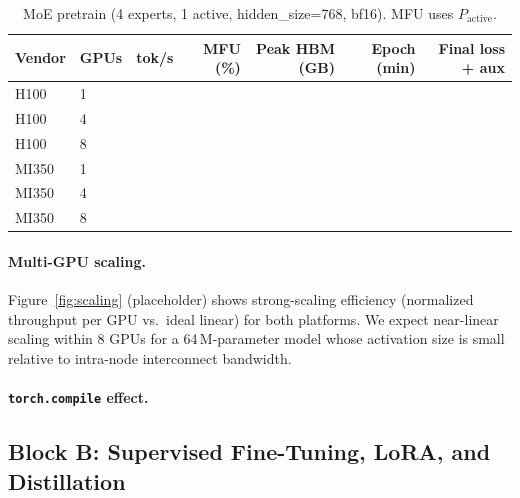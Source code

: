 \begin{table}[h]
\centering
\caption{MoE pretrain (4 experts, 1 active, hidden\_size=768, bf16). MFU uses $P_{\text{active}}$.}
\label{tab:pretrain_moe}
\small
\begin{tabular}{llrrrrr}
\toprule
\textbf{Vendor} & \textbf{GPUs} &
\textbf{tok/s} & \textbf{MFU (\%)} & \textbf{Peak HBM (GB)} &
\textbf{Epoch (min)} & \textbf{Final loss + aux} \\
\midrule
H100  & 1 & \PH{} & \PH{} & \PH{} & \PH{} & \PH{} \\
H100  & 4 & \PH{} & \PH{} & \PH{} & \PH{} & \PH{} \\
H100  & 8 & \PH{} & \PH{} & \PH{} & \PH{} & \PH{} \\
\midrule
MI350 & 1 & \PH{} & \PH{} & \PH{} & \PH{} & \PH{} \\
MI350 & 4 & \PH{} & \PH{} & \PH{} & \PH{} & \PH{} \\
MI350 & 8 & \PH{} & \PH{} & \PH{} & \PH{} & \PH{} \\
\bottomrule
\end{tabular}
\end{table}

\paragraph{Multi-GPU scaling.}
Figure~\ref{fig:scaling} (placeholder) shows strong-scaling efficiency
(normalized throughput per GPU vs.\ ideal linear) for both platforms.
We expect near-linear scaling within 8 GPUs for a 64\,M-parameter model
whose activation size is small relative to intra-node interconnect bandwidth.

\paragraph{\texttt{torch.compile} effect.}

\subsection{Block B: Supervised Fine-Tuning, LoRA, and Distillation}
\label{sec:training:posttrain}

